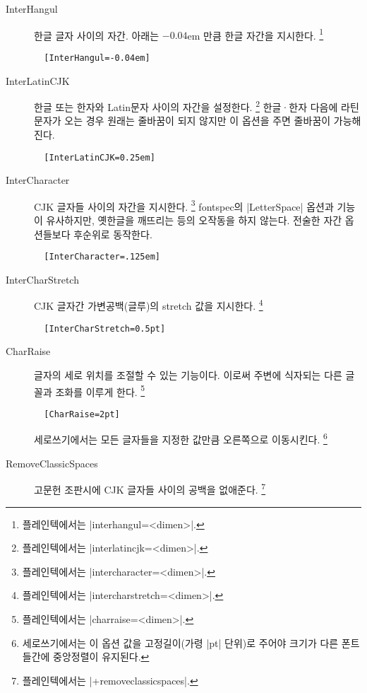 \documentclass[a4paper]{article}
\begin{document}
\begin{description}
  \item[InterHangul] %
    {한글 글자
    사이의 자간}.  아래는 $-0.04$em 만큼 한글 자간을 지시한다.%
    \footnote{%
      플레인텍에서는 |interhangul=<dimen>|. }
\begin{verbatim}
  [InterHangul=-0.04em]
\end{verbatim}

\item[InterLatinCJK] %
  한글 또는 한자와 Latin문자 사이의 자간을 설정한다.%
    \footnote{%
      플레인텍에서는 |interlatincjk=<dimen>|. }
    한글^^b7한자 다음에 라틴 문자가 오는 경우 원래는 줄바꿈이 되지 않지만
    이 옵션을 주면 줄바꿈이 가능해진다.
\begin{verbatim}
  [InterLatinCJK=0.25em]
\end{verbatim}

\item[InterCharacter] %
  CJK 글자들 사이의 자간을 지시한다.%
  \footnote{%
    플레인텍에서는 |intercharacter=<dimen>|. }
  fontspec의 |LetterSpace| 옵션과 기능이 유사하지만, 옛한글을 깨뜨리는 등의
  오작동을 하지 않는다. 전술한 자간 옵션들보다 후순위로 동작한다.
\begin{verbatim}
  [InterCharacter=.125em]
\end{verbatim}

\item[InterCharStretch] %
  CJK 글자간 가변공백{\small(글루)}의 stretch 값을 지시한다.%
  \footnote{%
    플레인텍에서는 |intercharstretch=<dimen>|. }
\begin{verbatim}
  [InterCharStretch=0.5pt]
\end{verbatim}

\item[CharRaise] %
  글자의 세로 위치를
  { 조절}할 수 있는 기능이다.
  이로써 주변에 식자되는 다른 글꼴과 조화를 이루게 한다.%
  \footnote{%
    플레인텍에서는 |charraise=<dimen>|. }
\begin{verbatim}
  [CharRaise=2pt]
\end{verbatim}
  세로쓰기에서는 모든 글자들을 지정한 값만큼 오른쪽으로 이동시킨다.%
  \footnote{%
    세로쓰기에서는 이 옵션 값을 고정길이(가령 |pt| 단위)로 주어야
    크기가 다른 폰트들간에 중앙정렬이 유지된다. }

\item[RemoveClassicSpaces] %
  고문헌 조판시에 CJK 글자들 사이의 공백을 없애준다.%
  \footnote{%
    플레인텍에서는 |+removeclassicspaces|. }


\end{description}
\end{document}
